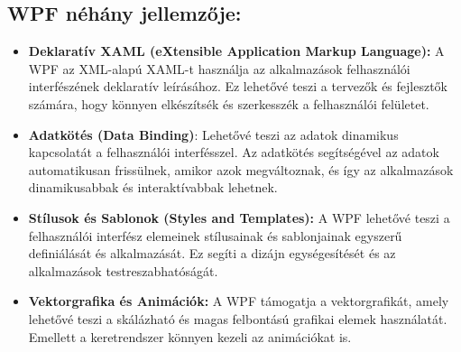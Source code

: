 \documentclass[
]{thesis-ekf}
\theoremstyle{definition}
\theoremstyle{remark}
\begin{document}
\subsection*{WPF néhány jellemzője:}
\begin{itemize}
	
	\item \textbf{Deklaratív XAML (eXtensible Application Markup Language):} 
	A WPF az XML-alapú XAML-t használja az alkalmazások felhasználói interfészének deklaratív leírásához. Ez lehetővé teszi a tervezők és fejlesztők számára, hogy könnyen elkészítsék és szerkesszék a felhasználói felületet.
	\item \textbf{Adatkötés (Data Binding)}: Lehetővé teszi az adatok dinamikus kapcsolatát a felhasználói interfésszel. Az adatkötés segítségével az adatok automatikusan frissülnek, amikor azok megváltoznak, és így az alkalmazások dinamikusabbak és interaktívabbak lehetnek.
	\item \textbf{Stílusok és Sablonok (Styles and Templates):} A WPF lehetővé teszi a felhasználói interfész elemeinek stílusainak és sablonjainak egyszerű definiálását és alkalmazását. Ez segíti a dizájn egységesítését és az alkalmazások testreszabhatóságát.
	\item \textbf{Vektorgrafika és Animációk:} A WPF támogatja a vektorgrafikát, amely lehetővé teszi a skálázható és magas felbontású grafikai elemek használatát. Emellett a keretrendszer könnyen kezeli az animációkat is.
\end{itemize}
\end{document}
